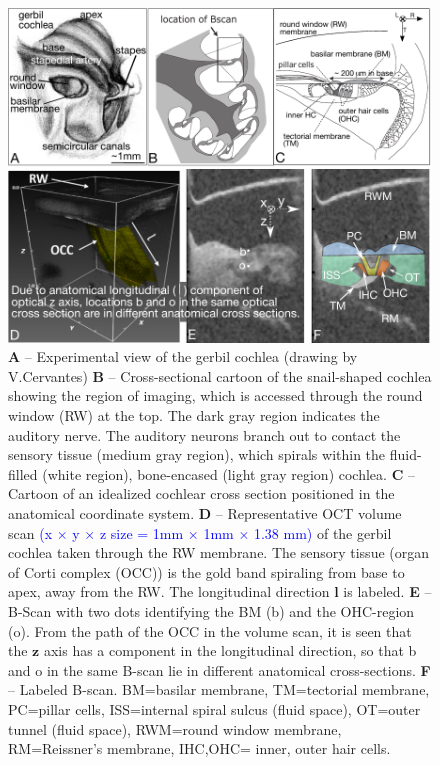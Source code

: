 \documentclass[preprint,NumberedRefs]{JASA}
\begin{document}
\begin{figure}[h!]
\centering
\includegraphics[width=\textwidth]{Figure1.pdf}
\caption{\textbf{A} -- Experimental view of the gerbil cochlea (drawing by V.Cervantes)  \textbf{B} -- Cross-sectional cartoon of the snail-shaped cochlea showing the region of imaging, which is accessed through the round window (RW) at the top.  The dark gray region indicates the auditory nerve.  The auditory neurons branch out to contact the sensory tissue (medium gray region), which spirals within the fluid-filled (white region), bone-encased (light gray region) cochlea.  \textbf{C} -- Cartoon of an idealized cochlear cross section positioned in the anatomical coordinate system.   \textbf{D} -- Representative OCT volume scan \textcolor{blue}{(x $\times$ y $\times$ z size = 1mm $\times$ 1mm $\times$ 1.38 mm)} of the gerbil cochlea taken through the RW membrane. The sensory tissue (organ of Corti complex (OCC)) is the gold band spiraling from base to apex, away from the RW. The longitudinal direction $\mathbf{l}$ is labeled. \textbf{E} -- B-Scan with two dots identifying the BM (b) and the OHC-region (o). From the path of the OCC in the volume scan, it is seen that the $\mathbf{z}$ axis has a component in the longitudinal direction, so that b and o in the same B-scan lie in different anatomical cross-sections. \textbf{F} -- Labeled B-scan. BM=basilar membrane, TM=tectorial membrane, PC=pillar cells, ISS=internal spiral sulcus (fluid space), OT=outer tunnel (fluid space), RWM=round window membrane, RM=Reissner's membrane, IHC,OHC= inner, outer hair cells. }
\label{crosssec1}
\end{figure}
\end{document}
